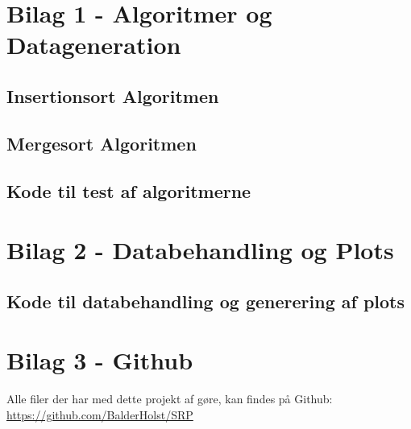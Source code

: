 \chapter*{Bilag 1 - Algoritmer og Datageneration}
\label{ch:Bilag 1}


\section*{Insertionsort Algoritmen}



\section*{Mergesort Algoritmen}



\section*{Kode til test af algoritmerne}


\chapter*{Bilag 2 - Databehandling og Plots}
\label{ch:Bilag 2}


\section*{Kode til databehandling og generering af plots}


\chapter*{Bilag 3 - Github}
\label{ch:Bilag 3}

Alle filer der har med dette projekt af gøre, kan findes på Github:
\url{https://github.com/BalderHolst/SRP}

